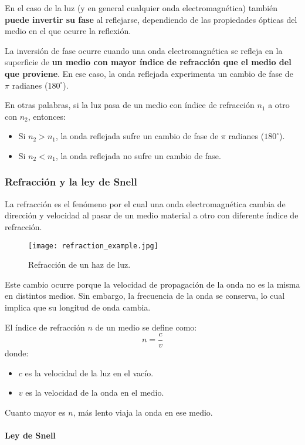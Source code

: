 En el caso de la luz (y en general cualquier onda electromagnética) también \textbf{puede invertir su fase} al reflejarse, dependiendo de las propiedades ópticas del medio en el que ocurre la reflexión.

La inversión de fase ocurre cuando una onda electromagnética se refleja en la superficie de \textbf{un medio con mayor índice de refracción que el medio del que proviene}. En ese caso, la onda reflejada experimenta un cambio de fase de \(\pi\) radianes (\(180^\circ\)).

En otras palabras, si la luz pasa de un medio con índice de refracción \(n_1\) a otro con \(n_2\), entonces:
\begin{itemize}
  \item Si \(n_2 > n_1\), la onda reflejada sufre un cambio de fase de \(\pi\) radianes (\(180^\circ\)).
  \item Si \(n_2 < n_1\), la onda reflejada no sufre un cambio de fase.
\end{itemize}

\subsubsection{Refracción y la ley de Snell}

La refracción es el fenómeno por el cual una onda electromagnética cambia de dirección y velocidad al pasar de un medio material a otro con diferente índice de refracción.

\begin{wrapfigure}{r}{0.3\textwidth}
  \centering
  \texttt{[image: refraction\_example.jpg]}
  \caption{Refracción de un haz de luz.}
  \label{fig:refraction}
\end{wrapfigure}
Este cambio ocurre porque la velocidad de propagación de la onda no es la misma en distintos medios. Sin embargo, la frecuencia de la onda se conserva, lo cual implica que su longitud de onda cambia.

El índice de refracción \(n\) de un medio se define como:
\[
n = \frac{c}{v}
\]
donde:
\begin{itemize}
  \item \(c\) es la velocidad de la luz en el vacío.
  \item \(v\) es la velocidad de la onda en el medio.
\end{itemize}
Cuanto mayor es \(n\), más lento viaja la onda en ese medio.

\paragraph{Ley de Snell}

